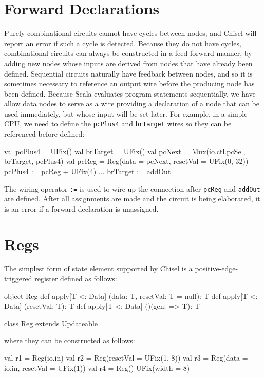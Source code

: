 \documentclass[10pt,twocolumn]{article}
\begin{document}
\section{Forward Declarations}

Purely combinational circuits cannot have cycles between nodes, and
Chisel will report an error if such a cycle is detected.  Because they
do not have cycles, combinational circuits can always be constructed
in a feed-forward manner, by adding new nodes whose inputs are derived
from nodes that have already been defined.  Sequential circuits
naturally have feedback between nodes, and so it is sometimes
necessary to reference an output wire before the producing node has
been defined.  Because Scala evaluates program statements
sequentially, we have allow data nodes to serve as a wire providing
a declaration of a node that can be used immediately, but whose
input will be set later.  
For example, in a simple CPU, we need to define the \verb!pcPlus4!
and \verb!brTarget! wires so they can be referenced before defined:
\begin{scala}
val pcPlus4  = UFix()
val brTarget = UFix()
val pcNext   = Mux(io.ctl.pcSel, brTarget, pcPlus4)
val pcReg    = Reg(data = pcNext, resetVal = UFix(0, 32))
pcPlus4     := pcReg + UFix(4)
...
brTarget    := addOut
\end{scala}

\noindent
The wiring operator
\verb!:=! is used to wire up
the connection after \verb!pcReg! and \verb!addOut! are defined.
After all assignments are made and the circuit is being elaborated, 
it is an error if a forward declaration is unassigned.

\section{Regs}

The simplest form of state element supported by Chisel is a
positive-edge-triggered register defined as follows:

\begin{scala}
object Reg {
  def apply[T <: Data]
        (data: T, resetVal: T = null): T
  def apply[T <: Data] (resetVal: T): T
  def apply[T <: Data] ()(gen: => T): T
}
 
class Reg extends Updateable
\end{scala}

\noindent
where they can be constructed as follows:

\begin{scala}
val r1 = Reg(io.in)
val r2 = Reg(resetVal = UFix(1, 8))
val r3 = Reg(data = io.in, resetVal = UFix(1))
val r4 = Reg(){ UFix(width = 8) }
\end{scala}
\end{document}
